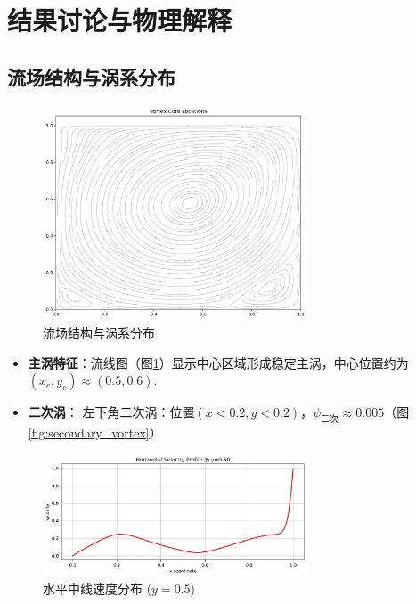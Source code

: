 \documentclass[UTF8]{ctexart}
\begin{document}
\newpage
\section{结果讨论与物理解释}

\subsection{流场结构与涡系分布}
\begin{figure}[h]
    \centering
    \includegraphics[width=0.7\textwidth]{1_streamlines.jpg}
    \caption{流场结构与涡系分布}
    \label{fig:streamlines}
\end{figure}

\begin{itemize}
    \item \textbf{主涡特征}：流线图（图\ref{fig:streamlines}）显示中心区域形成稳定主涡，中心位置约为$(x_c, y_c) \approx (0.5, 0.6)$.
    
    \item \textbf{二次涡}：
        左下角二次涡：位置$(x<0.2, y<0.2)$，$\psi_{\text{二次}} \approx 0.005$（图\ref{fig:secondary_vortex}）

\end{itemize}

\begin{figure}[h]
    \centering
    \includegraphics[width= 0.7\textwidth]{2_horizontal_profile.jpg}
    \caption{水平中线速度分布 ($y=0.5$)}
    \label{fig:horizontal_profile}
\end{figure}
\end{document}
